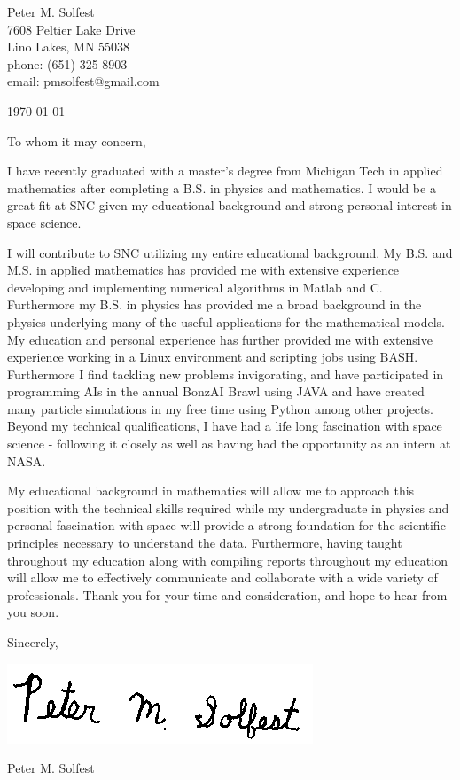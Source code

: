 \documentclass[letterpaper,12pt]{article}
\begin{document}
Peter M. Solfest\\
7608 Peltier Lake Drive\\
Lino Lakes, MN 55038\\
phone: (651) 325-8903\\
email: pmsolfest@gmail.com

\today


To whom it may concern, %

I have recently graduated with a master's degree from Michigan Tech in applied mathematics after
completing a B.S. in physics and mathematics.
I would be a great fit at SNC given my educational background
and strong personal interest in space science.

I will contribute to SNC utilizing my entire educational background.
My B.S. and M.S. in applied mathematics has provided me with extensive experience developing
and implementing numerical algorithms in Matlab and C.
Furthermore my B.S. in physics has provided me a broad background in the physics
underlying many of the useful applications for the mathematical models.
My education and personal experience has further provided me with
extensive experience working in a Linux environment and scripting
jobs using BASH.
Furthermore I find tackling new problems invigorating, and have
participated in programming AIs in the annual BonzAI Brawl using JAVA and
have created many particle simulations in my free time using Python among
other projects.
Beyond my technical qualifications, I have had a life long fascination with
space science - following it closely as well as having had the opportunity
as an intern at NASA.

My educational background in mathematics will allow 
me to approach this position with the technical skills required
while my undergraduate in physics and personal fascination with space
will provide a strong foundation for the scientific principles necessary
to understand the data.
Furthermore, having taught throughout my education along with compiling reports
throughout my education will allow me to effectively communicate and
collaborate with a wide variety of professionals.
Thank you for your time and consideration, and hope to hear from you soon.

Sincerely,

\includegraphics[height=.5in]{signature.png}

Peter M. Solfest
\end{document}
